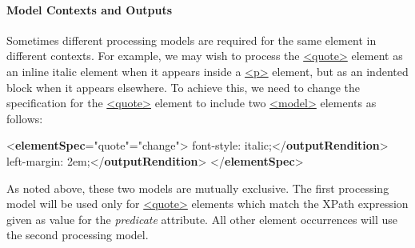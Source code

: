 \paragraph[{Model Contexts and Outputs}]{Model Contexts and Outputs}\label{TDPMMC}\par
Sometimes different processing models are required for the same element in different contexts. For example, we may wish to process the \hyperref[TEI.quote]{<quote>} element as an inline italic element when it appears inside a \hyperref[TEI.p]{<p>} element, but as an indented block when it appears elsewhere. To achieve this, we need to change the specification for the \hyperref[TEI.quote]{<quote>} element to include two \hyperref[TEI.model]{<model>} elements as follows: \par\bgroup{}\exampleFont \begin{shaded}\noindent\mbox{}{<\textbf{elementSpec}\hspace*{1em}{ident}="{quote}"\hspace*{1em}{mode}="{change}">}\mbox{}\newline 
{}\mbox{}\newline 
\hspace*{1em}font-style: italic;{</\textbf{outputRendition}>}\mbox{}\newline 
{}\mbox{}\newline 
{}\mbox{}\newline 
\hspace*{1em}left-margin: 2em;{</\textbf{outputRendition}>}\mbox{}\newline 
{}\mbox{}\newline 
{</\textbf{elementSpec}>}\end{shaded}\egroup\par \noindent  As noted above, these two models are mutually exclusive. The first processing model will be used only for \hyperref[TEI.quote]{<quote>} elements which match the XPath expression given as value for the {\itshape predicate} attribute. All other element occurrences will use the second processing model.\par
